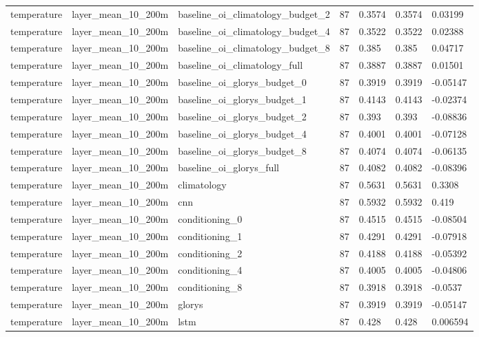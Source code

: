 \begin{table}[htbp]
\begin{tabular}{lllllll}
temperature & layer\_mean\_10\_200m & baseline\_oi\_climatology\_budget\_2 & 87 & 0.3574 & 0.3574 & 0.03199 \\
temperature & layer\_mean\_10\_200m & baseline\_oi\_climatology\_budget\_4 & 87 & 0.3522 & 0.3522 & 0.02388 \\
temperature & layer\_mean\_10\_200m & baseline\_oi\_climatology\_budget\_8 & 87 & 0.385 & 0.385 & 0.04717 \\
temperature & layer\_mean\_10\_200m & baseline\_oi\_climatology\_full & 87 & 0.3887 & 0.3887 & 0.01501 \\
temperature & layer\_mean\_10\_200m & baseline\_oi\_glorys\_budget\_0 & 87 & 0.3919 & 0.3919 & -0.05147 \\
temperature & layer\_mean\_10\_200m & baseline\_oi\_glorys\_budget\_1 & 87 & 0.4143 & 0.4143 & -0.02374 \\
temperature & layer\_mean\_10\_200m & baseline\_oi\_glorys\_budget\_2 & 87 & 0.393 & 0.393 & -0.08836 \\
temperature & layer\_mean\_10\_200m & baseline\_oi\_glorys\_budget\_4 & 87 & 0.4001 & 0.4001 & -0.07128 \\
temperature & layer\_mean\_10\_200m & baseline\_oi\_glorys\_budget\_8 & 87 & 0.4074 & 0.4074 & -0.06135 \\
temperature & layer\_mean\_10\_200m & baseline\_oi\_glorys\_full & 87 & 0.4082 & 0.4082 & -0.08396 \\
temperature & layer\_mean\_10\_200m & climatology & 87 & 0.5631 & 0.5631 & 0.3308 \\
temperature & layer\_mean\_10\_200m & cnn & 87 & 0.5932 & 0.5932 & 0.419 \\
temperature & layer\_mean\_10\_200m & conditioning\_0 & 87 & 0.4515 & 0.4515 & -0.08504 \\
temperature & layer\_mean\_10\_200m & conditioning\_1 & 87 & 0.4291 & 0.4291 & -0.07918 \\
temperature & layer\_mean\_10\_200m & conditioning\_2 & 87 & 0.4188 & 0.4188 & -0.05392 \\
temperature & layer\_mean\_10\_200m & conditioning\_4 & 87 & 0.4005 & 0.4005 & -0.04806 \\
temperature & layer\_mean\_10\_200m & conditioning\_8 & 87 & 0.3918 & 0.3918 & -0.0537 \\
temperature & layer\_mean\_10\_200m & glorys & 87 & 0.3919 & 0.3919 & -0.05147 \\
temperature & layer\_mean\_10\_200m & lstm & 87 & 0.428 & 0.428 & 0.006594 \\

\end{tabular}
\end{table}
